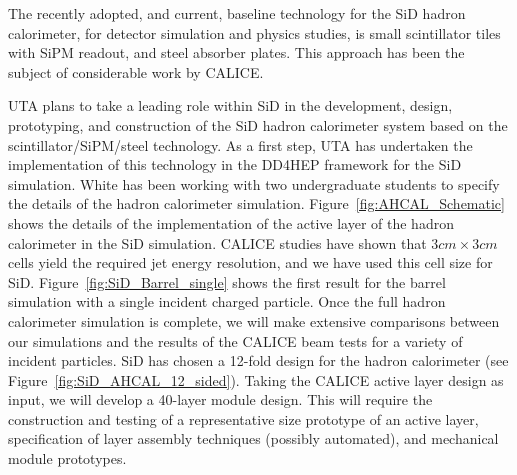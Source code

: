 The recently adopted, and current, baseline technology for the SiD hadron calorimeter, for detector simulation and physics studies, is small 
scintillator tiles with SiPM readout, and steel absorber plates. This approach has been the subject of considerable work by CALICE. 

UTA plans to take a leading role within SiD in the development, design, prototyping, and construction of the SiD hadron calorimeter system 
based on the scintillator/SiPM/steel technology. As a first step, UTA has undertaken the implementation of this technology in the DD4HEP \cite{DD4HEP} 
framework for the SiD simulation. White has been working with two undergraduate students to specify the details of the hadron calorimeter 
simulation. Figure~\ref{fig:AHCAL_Schematic} shows the details of the implementation of the active layer of the hadron calorimeter in the SiD simulation.
CALICE studies have shown that $3cm \times 3cm$ cells yield the required jet energy resolution, and we have used this cell size for SiD.
Figure~\ref{fig:SiD_Barrel_single} shows the first result for the barrel simulation with a single incident charged particle. Once the full hadron calorimeter 
simulation is complete, we will make extensive comparisons between our simulations and the results of the CALICE beam tests for a variety of incident
particles. 
SiD has chosen a 12-fold design for the hadron calorimeter (see Figure~\ref{fig:SiD_AHCAL_12_sided}). Taking the CALICE active layer design as input, we will 
develop a 40-layer module design. This will require the construction and testing of a representative size prototype of an active layer,
specification of layer assembly techniques (possibly automated), and mechanical module prototypes.

